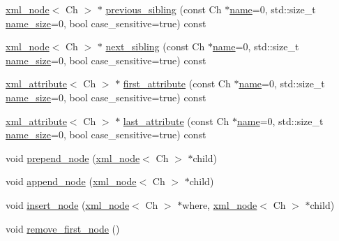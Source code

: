 \begin{DoxyCompactItemize}
\hyperlink{classrapidxml_1_1xml__node}{xml\+\_\+node}$<$ Ch $>$ $\ast$ \hyperlink{classrapidxml_1_1xml__node_a001ece4e227eebbd6ad0ec7dacf1c00b}{previous\+\_\+sibling} (const Ch $\ast$\hyperlink{classrapidxml_1_1xml__base_a9a09739310469995db078ebd0da3ed45}{name}=0, std\+::size\+\_\+t \hyperlink{classrapidxml_1_1xml__base_a7e7f98b3d01e1eab8dc1ca69aad9af84}{name\+\_\+size}=0, bool case\+\_\+sensitive=true) const 
\item 
\hyperlink{classrapidxml_1_1xml__node}{xml\+\_\+node}$<$ Ch $>$ $\ast$ \hyperlink{classrapidxml_1_1xml__node_ac59af4dd5f0ec715753e42467dff6aed}{next\+\_\+sibling} (const Ch $\ast$\hyperlink{classrapidxml_1_1xml__base_a9a09739310469995db078ebd0da3ed45}{name}=0, std\+::size\+\_\+t \hyperlink{classrapidxml_1_1xml__base_a7e7f98b3d01e1eab8dc1ca69aad9af84}{name\+\_\+size}=0, bool case\+\_\+sensitive=true) const 
\item 
\hyperlink{classrapidxml_1_1xml__attribute}{xml\+\_\+attribute}$<$ Ch $>$ $\ast$ \hyperlink{classrapidxml_1_1xml__node_ae426802be58114ffc41bf30ac6b8c37d}{first\+\_\+attribute} (const Ch $\ast$\hyperlink{classrapidxml_1_1xml__base_a9a09739310469995db078ebd0da3ed45}{name}=0, std\+::size\+\_\+t \hyperlink{classrapidxml_1_1xml__base_a7e7f98b3d01e1eab8dc1ca69aad9af84}{name\+\_\+size}=0, bool case\+\_\+sensitive=true) const 
\item 
\hyperlink{classrapidxml_1_1xml__attribute}{xml\+\_\+attribute}$<$ Ch $>$ $\ast$ \hyperlink{classrapidxml_1_1xml__node_a50c03f2db3fa51f27a73d86ec29a49d3}{last\+\_\+attribute} (const Ch $\ast$\hyperlink{classrapidxml_1_1xml__base_a9a09739310469995db078ebd0da3ed45}{name}=0, std\+::size\+\_\+t \hyperlink{classrapidxml_1_1xml__base_a7e7f98b3d01e1eab8dc1ca69aad9af84}{name\+\_\+size}=0, bool case\+\_\+sensitive=true) const 
\item 
void \hyperlink{classrapidxml_1_1xml__node_ae86e92908c3eab40bbed8216e4f3f3cb}{prepend\+\_\+node} (\hyperlink{classrapidxml_1_1xml__node}{xml\+\_\+node}$<$ Ch $>$ $\ast$child)
\item 
void \hyperlink{classrapidxml_1_1xml__node_a8696d098ecc9c4d2a646b43e91d58e31}{append\+\_\+node} (\hyperlink{classrapidxml_1_1xml__node}{xml\+\_\+node}$<$ Ch $>$ $\ast$child)
\item 
void \hyperlink{classrapidxml_1_1xml__node_a666880f42a7e486d78cc45ed51c7c46d}{insert\+\_\+node} (\hyperlink{classrapidxml_1_1xml__node}{xml\+\_\+node}$<$ Ch $>$ $\ast$where, \hyperlink{classrapidxml_1_1xml__node}{xml\+\_\+node}$<$ Ch $>$ $\ast$child)
\item 
void \hyperlink{classrapidxml_1_1xml__node_a62bf7b276cf7a651a3337f5e0a0ef6ac}{remove\+\_\+first\+\_\+node} ()

\end{DoxyCompactItemize}
